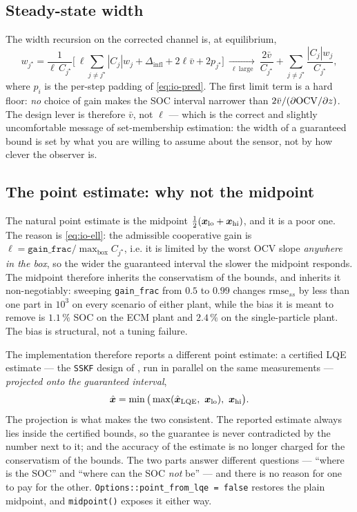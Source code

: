\subsection{Steady-state width}
The width recursion on the corrected channel is, at equilibrium,
\begin{equation}
w_{j^\star} = \frac{1}{\ell\,C_{j^\star}}
\Big[\ \ell\!\!\sum_{j\neq j^\star}\!\!|C_j|w_j + \Delta_{\mathrm{infl}} + 2\ell\bar{v} + 2p_{j^\star}\Big]
\ \xrightarrow[\ \ell\ \mathrm{large}\ ]{}\ \frac{2\bar{v}}{C_{j^\star}} + \sum_{j\neq j^\star}\frac{|C_j|w_j}{C_{j^\star}} ,
\label{eq:io-width}
\end{equation}
where $p_i$ is the per-step padding of \eqref{eq:io-pred}.  The first limit term is a hard floor:
\emph{no} choice of gain makes the SOC interval narrower than $2\bar{v}/(\partial\mathrm{OCV}/\partial z)$.
The design lever is therefore $\bar{v}$, not $\ell$ --- which is the correct and slightly
uncomfortable message of set-membership estimation: the width of a guaranteed bound is set by what
you are willing to assume about the sensor, not by how clever the observer is.

\subsection{The point estimate: why not the midpoint}
\label{sec:io-point}
The natural point estimate is the midpoint $\tfrac12(\bm{x}_{\mathrm{lo}}+\bm{x}_{\mathrm{hi}})$, and
it is a poor one.  The reason is \eqref{eq:io-ell}: the admissible cooperative gain is
$\ell = \texttt{gain\_frac}/\max_{\text{box}}C_{j^\star}$, i.e. it is limited by the worst OCV
slope \emph{anywhere in the box}, so the wider the guaranteed interval the slower the midpoint
responds.  The midpoint therefore inherits the conservatism of the bounds, and inherits it
non-negotiably: sweeping \texttt{gain\_frac} from $0.5$ to $0.99$ changes $\mathrm{rmse}_{ss}$ by
less than one part in $10^3$ on every scenario of either plant, while the bias it is meant to
remove is $1.1\,\%$ SOC on the ECM plant and $2.4\,\%$ on the single-particle plant.  The bias is
structural, not a tuning failure.

The implementation therefore reports a different point estimate: a certified LQE estimate ---
the \texttt{SSKF} design of , run in parallel on the same measurements ---
\emph{projected onto the guaranteed interval},
\begin{equation}
\xhat = \min\big(\max(\xhat_{\mathrm{LQE}},\ \vx_{\mathrm{lo}}),\ \vx_{\mathrm{hi}}\big) .
\label{eq:io-point}
\end{equation}
The projection is what makes the two consistent.  The reported estimate always lies inside the
certified bounds, so the guarantee is never contradicted by the number next to it; and the
accuracy of the estimate is no longer charged for the conservatism of the bounds.  The two parts
answer different questions --- ``where is the SOC'' and ``where can the SOC \emph{not} be'' ---
and there is no reason for one to pay for the other.  \texttt{Options::point\_from\_lqe = false}
restores the plain midpoint, and \texttt{midpoint()} exposes it either way.


